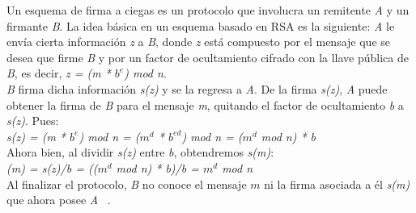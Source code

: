 Un esquema de firma a ciegas es un protocolo que involucra un remitente \textit{A} y un firmante \textit{B}. La idea básica en un esquema basado en RSA es la siguiente: \textit{A} le envía cierta información \textit{z} a \textit{B}, donde \textit{z} está compuesto por el mensaje que se desea que firme \textit{B} y por un factor de ocultamiento cifrado con la llave pública de \textit{B}, es decir, \textit{z = (m * $b^{e}$) mod n}. \\
\textit{B} firma dicha información \textit{s(z)} y se la regresa a \textit{A}. De la firma \textit{s(z)}, \textit{A} puede obtener la firma de \textit{B} para el mensaje \textit{m}, quitando el factor de ocultamiento \textit{b} a \textit{s(z)}. Pues: \\

\textit{s(z) = (m * $b^{e}$) mod n = ($m^{d}$ * $b^{ed}$) mod n = ($m^{d}$ mod n) * b} \\

Ahora bien, al dividir \textit{s(z)} entre \textit{b}, obtendremos \textit{s(m)}: \\

\textit{(m) = s(z)/b = (($m^{d}$ mod n) * b)/b = $m^{d}$ mod n} \\

Al finalizar el protocolo, \textit{B} no conoce el mensaje $m$ ni la firma asociada a él \textit{s(m)} que ahora posee \textit{A} ~\cite{ciegas}. \\

